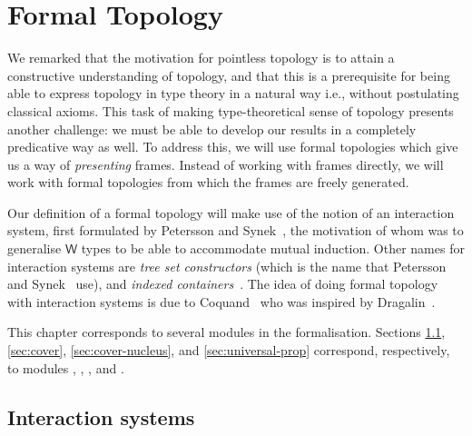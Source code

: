 \chapter{Formal Topology}\label{chap:formal-topo}

We remarked that the motivation for pointless topology is to attain a constructive
understanding of topology, and that this is a prerequisite for being able to express
topology in type theory in a natural way i.e., without postulating classical axioms. This
task of making type-theoretical sense of topology presents another challenge: we must be
able to develop our results in a completely predicative way as well. To address this, we
will use formal topologies which give us a way of \emph{presenting} frames. Instead of
working with frames directly, we will work with formal topologies from which the frames
are freely generated.

Our definition of a formal topology will make use of the notion of an interaction system,
first formulated by Petersson and Synek~\cite{tree-sets}, the motivation of whom was to
generalise $\mathsf{W}$ types to be able to accommodate mutual induction. Other names for
interaction systems are \emph{tree set constructors} (which is the name that Petersson and
Synek~\cite{tree-sets} use), and \emph{indexed containers}~\cite{indexed-containers}. The
idea of doing formal topology with interaction systems is due to Coquand~\cite{coq-posets}
who was inspired by Dragalin~\cite{dragalin}.

This chapter corresponds to several modules in the \veragda{} formalisation. Sections
\ref{sec:intr-sys}, \ref{sec:cover}, \ref{sec:cover-nucleus}, and \ref{sec:universal-prop}
correspond, respectively, to modules , ,
, and .

\section{Interaction systems}\label{sec:intr-sys}

